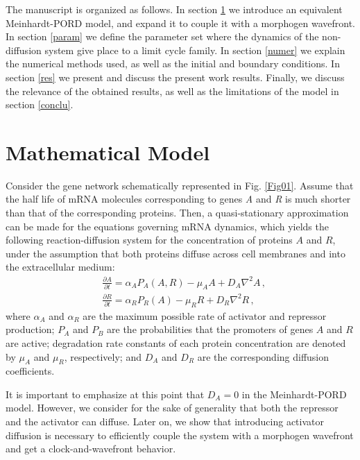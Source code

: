 \documentclass[%
 preprint,
 aip, 
 amsmath,amssymb,
]{revtex4-2}
\begin{document}
The manuscript is organized as follows. In section \ref{model} we introduce an equivalent Meinhardt-PORD model, and expand it to couple it with a morphogen wavefront. In section \ref{param} we define the parameter set where the dynamics of the non-diffusion system give place to a limit cycle family. In section \ref{numer} we explain the numerical methods used, as well as the initial and boundary conditions. In section \ref{res} we present and discuss the present work results. Finally, we discuss the relevance of the obtained results, as well as the limitations of the model in section \ref{conclu}.
	
	\section{Mathematical Model}
	\label{model}
	
Consider the gene network schematically represented in Fig. \ref{Fig01}. Assume that the half life of mRNA molecules corresponding to genes \textit{A} and \textit{R} is much shorter than that of the corresponding proteins. Then, a quasi-stationary approximation can be made for the equations governing mRNA dynamics, which yields the following reaction-diffusion system for the concentration of proteins $A$ and $R$, under the assumption that both proteins diffuse across cell membranes and into the extracellular medium:
	\begin{subequations}\label{eq012}
		\begin{flalign}
		& \frac{\partial A}{\partial t} = \alpha_A P_A (A, R) - \mu_A A + D_A \nabla^2 A\,,
		\label{eq01} \\
		& \frac{\partial R}{\partial t} = \alpha_R P_R (A) - \mu_R R + D_R \nabla^2 R\,,
		\label{eq02}
		\end{flalign}
	\end{subequations}
where $\alpha_A$ and $\alpha_R$ are the maximum possible rate of activator and repressor production; $P_A$ and $P_B$ are the probabilities that the promoters of genes $A$ and $R$ are active; degradation rate constants of each protein concentration are denoted by $\mu_A$ and $\mu_R$, respectively; and $D_A$ and $D_R$ are the corresponding diffusion coefficients.

It is important to emphasize at this point that $D_A = 0$ in the Meinhardt-PORD model. However, we consider for the sake of generality that both the repressor and the activator can diffuse. Later on, we show that introducing activator diffusion is necessary to efficiently couple the system with a morphogen wavefront and get a clock-and-wavefront behavior.
	
\end{document}
